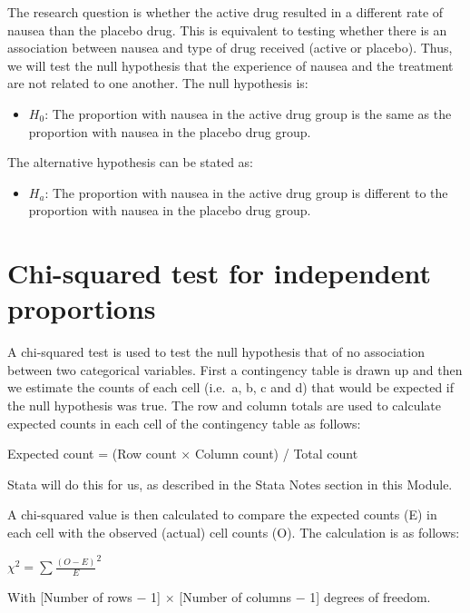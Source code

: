 \documentclass[
]{memoir}
\providecommand{\tightlist}{%
  \setlength{\itemsep}{0pt}\setlength{\parskip}{0pt}}
\begin{document}
The research question is whether the active drug resulted in a different rate of nausea than the placebo drug. This is equivalent to testing whether there is an association between nausea and type of drug received (active or placebo). Thus, we will test the null hypothesis that the experience of nausea and the treatment are not related to one another. The null hypothesis is:

\begin{itemize}
\tightlist
\item
  \(H_0\): The proportion with nausea in the active drug group is the same as the proportion with nausea in the placebo drug group.
\end{itemize}

The alternative hypothesis can be stated as:

\begin{itemize}
\tightlist
\item
  \(H_a\): The proportion with nausea in the active drug group is different to the proportion with nausea in the placebo drug group.
\end{itemize}

\hypertarget{chi-squared-test-for-independent-proportions}{%
\section{Chi-squared test for independent proportions}\label{chi-squared-test-for-independent-proportions}}

A chi-squared test is used to test the null hypothesis that of no association between two categorical variables. First a contingency table is drawn up and then we estimate the counts of each cell (i.e.~a, b, c and d) that would be expected if the null hypothesis was true. The row and column totals are used to calculate expected counts in each cell of the contingency table as follows:

Expected count = (Row count × Column count) / Total count

Stata will do this for us, as described in the Stata Notes section in this Module.

A chi-squared value is then calculated to compare the expected counts (E) in each cell with the observed (actual) cell counts (O). The calculation is as follows:

\(\chi ^ 2 = \sum \frac{(O - E)}{E} ^2\)

With {[}Number of rows \(-\) 1{]} \(\times\) {[}Number of columns \(-\) 1{]} degrees of freedom.
\end{document}
